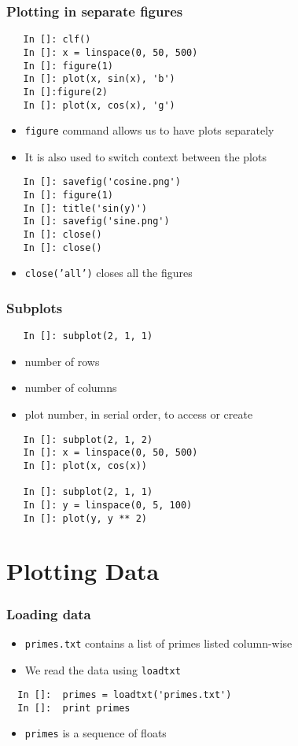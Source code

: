 \begin{frame}[fragile]
  \frametitle{Plotting in separate figures}
  \begin{lstlisting}
   In []: clf()
   In []: x = linspace(0, 50, 500)
   In []: figure(1)
   In []: plot(x, sin(x), 'b')
   In []:figure(2)
   In []: plot(x, cos(x), 'g')
  \end{lstlisting}
  \begin{itemize}
  \item \texttt{figure} command allows us to have plots separately
  \item It is also used to switch context between the plots
  \end{itemize}
  \begin{lstlisting}
   In []: savefig('cosine.png')
   In []: figure(1)
   In []: title('sin(y)')
   In []: savefig('sine.png')
   In []: close()
   In []: close()
  \end{lstlisting}
  \begin{itemize}
  \item \texttt{close('all')} closes all the figures
  \end{itemize}
\end{frame}

\begin{frame}[fragile]
  \frametitle{Subplots}
  \begin{lstlisting}
   In []: subplot(2, 1, 1)
  \end{lstlisting}
  \begin{itemize}
  \item number of rows
  \item number of columns
  \item plot number, in serial order, to access or create
  \end{itemize}
  \begin{lstlisting}
   In []: subplot(2, 1, 2)
   In []: x = linspace(0, 50, 500)
   In []: plot(x, cos(x))

   In []: subplot(2, 1, 1)
   In []: y = linspace(0, 5, 100)
   In []: plot(y, y ** 2)
  \end{lstlisting}
\end{frame}

\section{Plotting Data}

\begin{frame}[fragile]
  \frametitle{Loading data}
  \begin{itemize}
  \item \texttt{primes.txt} contains a list of primes listed
    column-wise
  \item We read the data using \texttt{loadtxt} 
  \end{itemize}
  \begin{lstlisting}
  In []:  primes = loadtxt('primes.txt')
  In []:  print primes
  \end{lstlisting}
  \begin{itemize}
  \item \texttt{primes} is a sequence of floats
  \end{itemize}
\end{frame}

